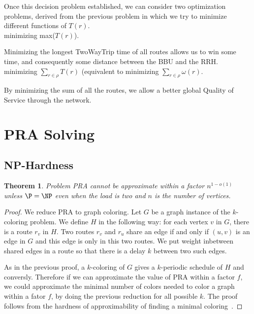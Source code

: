 \documentclass[a4paper,10pt]{article}
\newtheorem{theorem}{Theorem}
\begin{document}
    Once this decision problem established, we can consider two optimization problems, derived from the previous problem in which
    we try to minimize different functions of $T(r)$.\\

     minimizing max($T(r)$).

    Minimizing the longest TwoWayTrip time of all routes allows us to win some time, and consequently some distance between the BBU and the RRH.\\

     minimizing $\sum_{r \in \rho}  T(r)$ (equivalent to minimizing $\sum_{r \in \rho}  \omega(r)$.

    By minimizing the sum of all the routes, we allow a better global Quality of Service through the network.\\
  
\section{PRA Solving}
  
  \subsection{NP-Hardness}
	
   
    \begin{theorem}
    Problem PRA cannot be approximate within a factor $n^{1-o(1)}$ unless $\P = \NP$ even when the load is two
    and $n$ is the number of vertices.
    \end{theorem}

    \begin{proof}
    We reduce PRA to graph coloring. Let $G$ be a graph instance of the $k$-coloring problem. 
    We define $H$ in the following way: for each vertex $v$ in $G$, there is a route $r_v$ in $H$.
    Two routes $r_v$ and $r_u$ share an edge if and only if $(u,v)$ is an edge in $G$ and this edge is only in this two routes. 
    We put weight inbetween shared edges in a route so that there is a delay $k$ between two such edges. 
    
    As in the previous proof, a $k$-coloring of $G$ gives a $k$-periodic schedule of $H$
    and conversly. Therefore if we can approximate the value of PRA  within a factor $f$,
    we could approximate the minimal number of colors needed to color a graph within a fator $f$, 
    by doing the previous reduction for all possible $k$. The proof follows from the hardness of approximability
    of finding a minimal coloring~\cite{zuckerman2006linear}.
    \end{proof}
\end{document}
